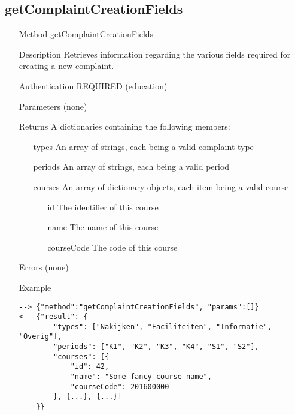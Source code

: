 \documentclass[a4paper]{scrreprt}
\begin{document}
\clearpage
\subsection{getComplaintCreationFields}\label{m:getComplaintCreationFields}
\begin{enumerate}
\item[Method] getComplaintCreationFields
\item[Description] Retrieves information regarding the various fields required for creating a new complaint.
\item[Authentication] REQUIRED (education)
\item[Parameters] (none)
\item[Returns] A dictionaries containing the following members:
\begin{enumerate}
    \item[types] An array of strings, each being a valid complaint type
    \item[periods] An array of strings, each being a valid period
    \item[courses] An array of dictionary objects, each item being a valid course
    \begin{enumerate}
        \item[id] The identifier of this course
        \item[name] The name of this course
        \item[courseCode] The code of this course
        \end{enumerate}
	\end{enumerate}
\item[Errors] (none)
\item[Example]
\begin{lstlisting}
--> {"method":"getComplaintCreationFields", "params":[]}
<-- {"result": {
        "types": ["Nakijken", "Faciliteiten", "Informatie", "Overig"],
        "periods": ["K1", "K2", "K3", "K4", "S1", "S2"],
        "courses": [{
            "id": 42,
            "name": "Some fancy course name",
            "courseCode": 201600000
        }, {...}, {...}]
    }}
\end{lstlisting}
\end{enumerate}


\clearpage
\end{document}
